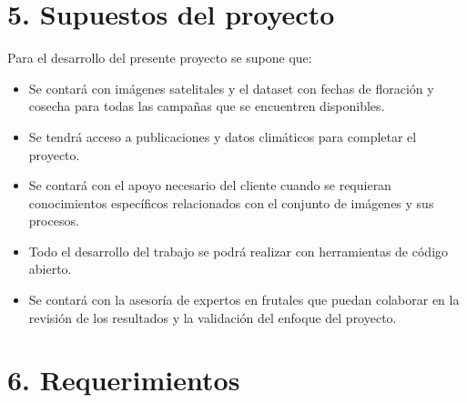 \documentclass[
11pt, %
]{charter}
\begin{document}
\section{5. Supuestos del proyecto}
\label{sec:supuestos}

Para el desarrollo del presente proyecto se supone que: 

\begin{itemize}
	\item Se contará con imágenes satelitales y el dataset con fechas de floración y cosecha 
	para todas las campañas que se encuentren disponibles.	
	\item Se tendrá acceso a publicaciones y datos climáticos para completar el proyecto.
	\item Se contará con el apoyo necesario del cliente cuando se requieran conocimientos específicos
	relacionados con el conjunto de imágenes y sus procesos.
	\item Todo el desarrollo del trabajo se podrá realizar con herramientas de código abierto.
	\item Se contará con la asesoría de expertos en frutales que puedan colaborar en la revisión
    de los resultados y la validación del enfoque del proyecto.
\end{itemize}



\section{6. Requerimientos}
\label{sec:requerimientos}
\end{document}
